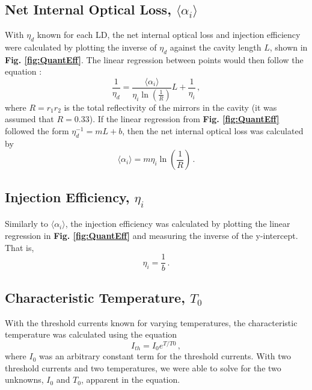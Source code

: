 \documentclass[9pt,twocolumn,twoside]{osajnl}
\begin{document}
\subsection*{Net Internal Optical Loss, $\langle \alpha_i \rangle$}
\indent \indent With $\eta_d$ known for each LD, the net internal optical loss and injection efficiency were calculated by plotting the inverse of $\eta_d$ against the cavity length $L$, shown in \textbf{Fig. \ref{fig:QuantEff}}. The linear regression between points would then follow the equation \cite{Coldren}:
\begin{equation}
    \frac{1}{\eta_d}=\frac{\langle \alpha_i \rangle}{\eta_i \ln{\left(\frac{1}{R}\right)}}L + \frac{1}{\eta_i} \,,
\end{equation}
where $R=r_1r_2$ is the total reflectivity of the mirrors in the cavity (it was assumed that $R=0.33$). If the linear regression from \textbf{Fig. \ref{fig:QuantEff}} followed the form $\eta_d^{-1}=mL+b$, then the net internal optical loss was calculated by
\begin{equation}
    \langle \alpha_i \rangle = m\eta_i \ln{\left(\frac{1}{R}\right)} \,.
\end{equation}

\subsection*{Injection Efficiency, $\eta_i$}
\indent \indent Similarly to $\langle \alpha_i \rangle$, the injection efficiency was calculated by plotting the linear regression in \textbf{Fig. \ref{fig:QuantEff}} and measuring the inverse of the y-intercept. That is,
\begin{equation}
    \eta_i = \frac{1}{b} \,.
\end{equation}

\subsection*{Characteristic Temperature, $T_0$}
\indent \indent With the threshold currents known for varying temperatures, the characteristic temperature was calculated using the equation
\begin{equation}
    I_{th}=I_0e^{T/T0} \,,
\end{equation}
where $I_0$ was an arbitrary constant term for the threshold currents. With two threshold currents and two temperatures, we were able to solve for the two unknowns, $I_0$ and $T_0$, apparent in the equation. 
\end{document}
